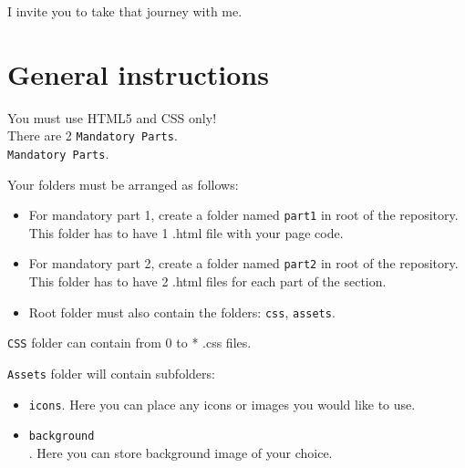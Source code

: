 \documentclass{42-en}
\begin{document}
    I invite you to take that journey with me.\\

    \newpage

\chapter{General instructions}

    You must use HTML5 and CSS only!\\

    There are 2 \texttt{Mandatory Parts}.\\ 

    \texttt{Mandatory Parts}.
    
    Your folders must be arranged as follows:
    \begin{itemize}\itemsep1pt
        \item For mandatory part 1, create a folder named \texttt{part1} in root of the repository. This folder has to have 1 .html file with your page code.
        \item For mandatory part 2, create a folder named \texttt{part2} in root of the repository. This folder has to have 2 .html files for each part of the section.
        \item Root folder must also contain the folders: \texttt{css}, \texttt{assets}.\\
    \end{itemize}
    
    \texttt{CSS} folder can contain from 0 to * .css files.

    \texttt{Assets} folder will contain subfolders:
    \begin{itemize}\itemsep1pt
        \item \texttt{icons}. Here you can place any icons or images you would like to use.
        \item \texttt{background}\\. Here you can store background image of your choice.
    \end{itemize}

\end{document}

